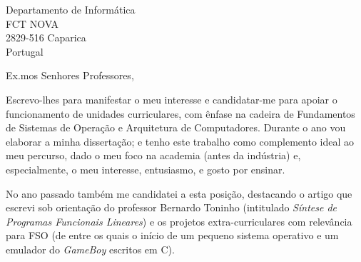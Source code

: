 \documentclass[11pt]{letter} %
\begin{document}

\begin{letter}{Departamento de Informática\\
FCT NOVA\\
2829-516 Caparica\\
Portugal} 


\signature{Rodrigo Mesquita} %


\opening{Ex.mos Senhores Professores,} 
 
Escrevo-lhes para manifestar o meu interesse e candidatar-me para apoiar o
    funcionamento de unidades curriculares, com ênfase na cadeira de Fundamentos
    de Sistemas de Operação e Arquitetura de Computadores. Durante o ano vou
    elaborar a minha dissertação; e tenho este trabalho como complemento ideal
    ao meu percurso, dado o meu foco na academia (antes da indústria) e,
    especialmente, o meu interesse, entusiasmo, e gosto por ensinar.

No ano passado também me candidatei a esta posição, destacando o artigo que escrevi sob
    orientação do professor Bernardo Toninho (intitulado \emph{Síntese de Programas
    Funcionais Lineares}) e os projetos extra-curriculares com relevância para
    FSO (de entre os quais o início de um pequeno sistema operativo e um
    emulador do \emph{GameBoy} escritos em C).


\end{letter}
\end{document}
